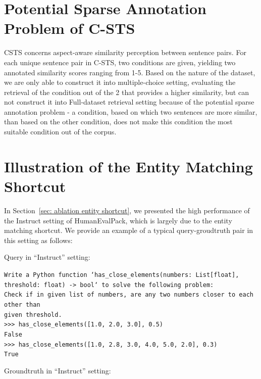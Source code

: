 \documentclass{article} %
\begin{document}


\section{Potential Sparse Annotation Problem of C-STS}
\label{appendix: csts sparse annotation}

CSTS concerns aspect-aware similarity perception between sentence pairs. For each unique sentence pair in C-STS, two conditions are given, yielding two annotated similarity scores ranging from 1-5. Based on the nature of the dataset, we are only able to construct it into multiple-choice setting, evaluating the retrieval of the condition out of the 2 that provides a higher similarity, but can not construct it into Full-dataset retrieval setting because of the potential sparse annotation problem \citep{thakur2021beir} - a condition, based on which two sentences are more similar, than based on the other condition, does not make this condition the most suitable condition out of the corpus. 

\section{Illustration of the Entity Matching Shortcut}
\label{appendix: entity matching shortcut}

In Section~\ref{sec: ablation entity shortcut}, we presented the high performance of the Instruct setting of HumanEvalPack, which is largely due to the entity matching shortcut. We provide an example of a typical query-groudtruth pair in this setting as follows:

Query in ``Instruct'' setting:

\begin{minipage}{\textwidth}
\small\texttt{Write a Python function `has\_close\_elements(numbers: List[float], threshold: float) -> bool` to solve the following problem:\\Check if in given list of numbers, are any two numbers closer to each other than\\given threshold.\\>>> has\_close\_elements([1.0, 2.0, 3.0], 0.5)\\False\\>>> has\_close\_elements([1.0, 2.8, 3.0, 4.0, 5.0, 2.0], 0.3)\\True}
\end{minipage}

Groundtruth in ``Instruct'' setting:
\end{document}

